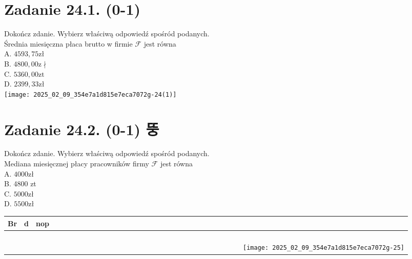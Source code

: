 \documentclass[10pt]{article}
\begin{document}
\section*{Zadanie 24.1. (0-1)}
Dokończ zdanie. Wybierz właściwą odpowiedź spośród podanych.\\
Średnia miesięczna płaca brutto w firmie \(\mathcal{F}\) jest równa\\
A. \(4593,75 \mathrm{zł}\)\\
B. \(4800,00 \mathrm{z} \nmid\)\\
C. \(5360,00 \mathrm{zt}\)\\
D. \(2399,33 \mathrm{zł}\)\\
\texttt{[image: 2025\_02\_09\_354e7a1d815e7eca7072g-24(1)]}

\section*{Zadanie 24.2. (0-1) 뚱}
Dokończ zdanie. Wybierz właściwą odpowiedź spośród podanych.\\
Mediana miesięcznej płacy pracowników firmy \(\mathcal{F}\) jest równa\\
A. \(4000 \mathrm{zł}\)\\
B. 4800 zt\\
C. \(5000 \mathrm{zł}\)\\
D. \(5500 \mathrm{zł}\)

\begin{center}
\begin{tabular}{|c|c|c|c|c|c|c|c|c|c|c|c|c|c|c|c|c|c|c|c|c|c|c|c|c|c|c|c|c|c|}
\hline
Br & d & nop &  &  &  &  &  &  &  &  &  &  &  &  &  &  &  &  &  &  &  &  &  &  &  &  &  &  &  \\
\hline
 &  &  &  &  &  &  &  &  &  &  &  &  &  &  &  &  &  &  &  &  &  &  &  &  &  &  &  &  &  \\
\hline
 &  &  &  &  &  &  &  &  &  &  &  &  &  &  &  &  &  &  &  &  &  &  &  &  &  &  &  &  &  \\
\hline
 &  &  &  &  &  &  &  &  &  &  &  &  &  &  &  &  &  &  &  &  &  &  &  &  &  &  &  &  &  \\
\hline
 &  &  &  &  &  &  &  &  &  &  &  &  &  &  &  &  &  &  &  &  &  &  &  &  &  &  &  &  &  \\
\hline
 &  &  &  &  &  &  &  &  &  &  &  &  &  &  &  &  &  &  &  &  &  &  &  &  &  &  &  &  & \texttt{[image: 2025\_02\_09\_354e7a1d815e7eca7072g-25]}
 \\
\hline
\end{tabular}
\end{center}
\end{document}
